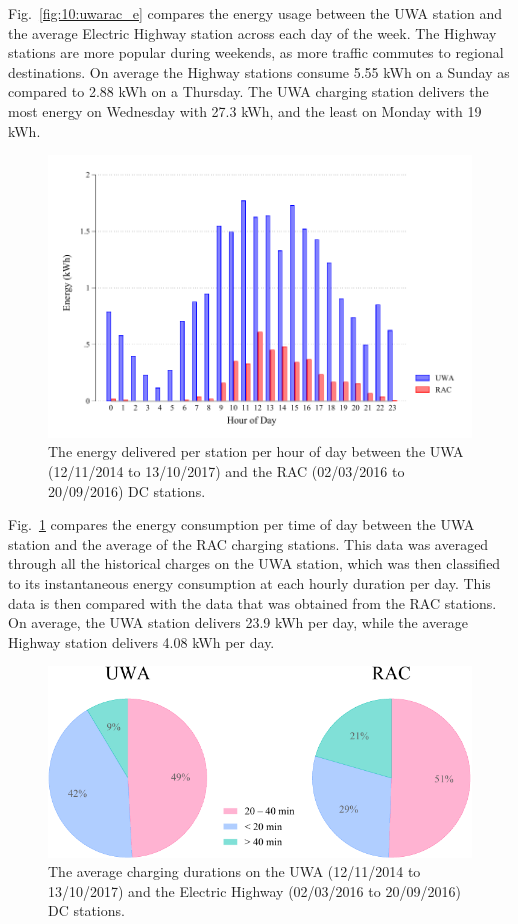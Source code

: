 Fig.~\ref{fig:10:uwarac_e} compares the energy usage between the UWA station and the average Electric Highway station across each day of the week. The Highway stations are more popular during weekends, as more traffic commutes to regional destinations. On average the Highway stations consume 5.55 kWh on a Sunday as compared to 2.88 kWh on a Thursday. The UWA charging station delivers the most energy on Wednesday with 27.3 kWh, and the least on Monday with 19 kWh.

\begin{figure}[H]
	\centering
	\includegraphics[width=0.8\linewidth]{uwarac_h_e}
	\caption[Energy delivered per station per hour of day]{The energy delivered per station per hour of day between the UWA (12/11/2014 to 13/10/2017) and the RAC (02/03/2016 to 20/09/2016) DC stations.}
	\label{fig:10:uwarac_h_e}
\end{figure}

Fig.~\ref{fig:10:uwarac_h_e} compares the energy consumption per time of day between the UWA station and the average of the RAC charging stations. This data was averaged through all the historical charges on the UWA station, which was then classified to its instantaneous energy consumption at each hourly duration per day. This data is then compared with the data that was obtained from the RAC stations. On average, the UWA station delivers 23.9 kWh per day, while the average Highway station delivers 4.08 kWh per day. 

\begin{figure}[H]
	\centering
	\includegraphics[width=0.8\linewidth]{dur}
	\caption[Average charging durations on the DC stations.]{The average charging durations on the UWA (12/11/2014 to 13/10/2017) and the Electric Highway (02/03/2016 to 20/09/2016) DC stations.}
	\label{fig:10:dur}
\end{figure}

